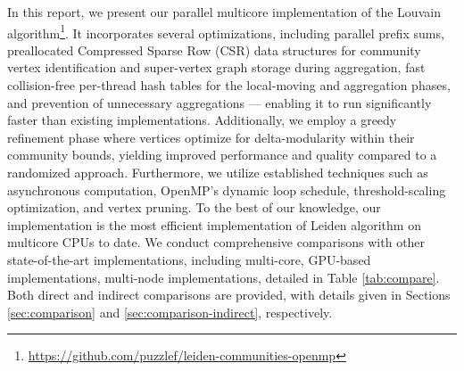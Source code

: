 In this report, we present our parallel multicore implementation of the Louvain algorithm\footnote{\url{https://github.com/puzzlef/leiden-communities-openmp}}. It incorporates several optimizations, including parallel prefix sums, preallocated Compressed Sparse Row (CSR) data structures for community vertex identification and super-vertex graph storage during aggregation, fast collision-free per-thread hash tables for the local-moving and aggregation phases, and prevention of unnecessary aggregations --- enabling it to run significantly faster than existing implementations. Additionally, we employ a greedy refinement phase where vertices optimize for delta-modularity within their community bounds, yielding improved performance and quality compared to a randomized approach. Furthermore, we utilize established techniques such as asynchronous computation, OpenMP's dynamic loop schedule, threshold-scaling optimization, and vertex pruning. To the best of our knowledge, our implementation is the most efficient implementation of Leiden algorithm on multicore CPUs to date. We conduct comprehensive comparisons with other state-of-the-art implementations, including multi-core, GPU-based implementations, multi-node implementations, detailed in Table \ref{tab:compare}. Both direct and indirect comparisons are provided, with details given in Sections \ref{sec:comparison} and \ref{sec:comparison-indirect}, respectively.











